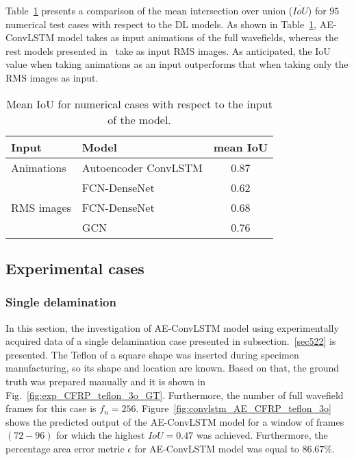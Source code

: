 Table~\ref{tab:meanIoU_vs_input} presents a comparison of the mean intersection over union (\(\overline{IoU}\)) for \(95\) numerical test cases with respect to the DL models.
As shown in Table~\ref{tab:meanIoU_vs_input}, AE-ConvLSTM model takes as input animations of the full wavefields, whereas the rest models presented in~\cite{Ijjeh2021, Ijjeh2022} take as input RMS images.
As anticipated, the IoU value when taking animations as an input outperforms that when taking only the RMS images as input. 
\begin{table}[!h]
	\centering
	\caption{Mean IoU for numerical cases with respect to the input of the model.}
	\begin{tabular}{llc}
		\toprule
		Input & Model & mean IoU \\ 
		\midrule
		Animations & Autoencoder ConvLSTM & 0.87 \\ 
		\midrule
		\multirow{3}{*}{RMS images}  
		& FCN-DenseNet~\cite{Ijjeh2021} & 0.62   \\
		& FCN-DenseNet~\cite{Ijjeh2022} & 0.68   \\
		& GCN~\cite{Ijjeh2022}          & 0.76   \\ 
		\bottomrule
	\end{tabular}
	\label{tab:meanIoU_vs_input}
\end{table}
\clearpage
\subsection{Experimental cases}
\label{sec532}

\subsubsection{Single delamination}
\label{sec5321}
In this section, the investigation of AE-ConvLSTM model using experimentally acquired data of a single delamination case presented in subsection.~\ref{sec522} is presented. 
The Teflon of a square shape was inserted during specimen manufacturing, so its shape and location are known.
Based on that, the ground truth was prepared manually and it is shown in Fig.~\ref{fig:exp_CFRP_teflon_3o_GT}. 
Furthermore, the number of full wavefield frames for this case is \(f_n = 256\).
Figure~\ref{fig:convlstm_AE_CFRP_teflon_3o} shows the predicted output of the AE-ConvLSTM model for a window of frames \((72-96)\) for which the highest \(IoU=0.47\) was achieved.
Furthermore, the percentage area error metric \(\epsilon\) for AE-ConvLSTM model was equal to \(86.67\%\).

